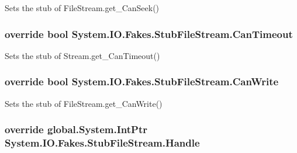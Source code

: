 Sets the stub of File\-Stream.\-get\-\_\-\-Can\-Seek()

\hypertarget{class_system_1_1_i_o_1_1_fakes_1_1_stub_file_stream_a8189a942ec0ea196bc25a77867b7f6bb}{
\subsubsection[{Can\-Timeout}]{\setlength{\rightskip}{0pt plus 5cm}override bool System.\-I\-O.\-Fakes.\-Stub\-File\-Stream.\-Can\-Timeout\hspace{0.3cm}{\ttfamily [get]}}}\label{class_system_1_1_i_o_1_1_fakes_1_1_stub_file_stream_a8189a942ec0ea196bc25a77867b7f6bb}


Sets the stub of Stream.\-get\-\_\-\-Can\-Timeout()

\hypertarget{class_system_1_1_i_o_1_1_fakes_1_1_stub_file_stream_aadf1d6c36f799460a30d53e8e7540f66}{
\subsubsection[{Can\-Write}]{\setlength{\rightskip}{0pt plus 5cm}override bool System.\-I\-O.\-Fakes.\-Stub\-File\-Stream.\-Can\-Write\hspace{0.3cm}{\ttfamily [get]}}}\label{class_system_1_1_i_o_1_1_fakes_1_1_stub_file_stream_aadf1d6c36f799460a30d53e8e7540f66}


Sets the stub of File\-Stream.\-get\-\_\-\-Can\-Write()

\hypertarget{class_system_1_1_i_o_1_1_fakes_1_1_stub_file_stream_a86b7082be92367557a30d4955b1939a7}{
\subsubsection[{Handle}]{\setlength{\rightskip}{0pt plus 5cm}override global.\-System.\-Int\-Ptr System.\-I\-O.\-Fakes.\-Stub\-File\-Stream.\-Handle\hspace{0.3cm}{\ttfamily [get]}}}\label{class_system_1_1_i_o_1_1_fakes_1_1_stub_file_stream_a86b7082be92367557a30d4955b1939a7}


